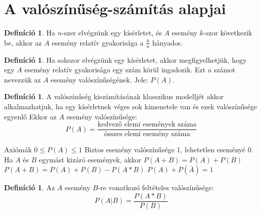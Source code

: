 \documentclass[twoside,12pt]{report}
\theoremstyle{definition}
\newtheorem{definition}[theorem]{Definíció}
\begin{document}
\section{A valószínűség-számítás alapjai}
	\begin{definition}
		Ha $n$-szer elvégzünk egy kísérletet, és $A$ esemény $k$-szor következik be, akkor az $A$ esemény relatív gyakorisága a $\frac{k}{n}$ hányados.
	\end{definition}
	\begin{definition}
		Ha sokszor elvégzünk egy kísérletet, akkor megfigyelhetjük, hogy egy $A$ esemény
		relatív gyakorisága egy szám körül ingadozik. Ezt a számot nevezzük az $A$ esemény valószínűségének. Jele: $P(A)$.
	\end{definition}
	\begin{definition}
		A valószínűség kiszámításának klasszikus modelljét akkor alkalmazhatjuk, ha egy kísérletnek véges sok kimenetele van és ezek valószínűsége egyenlő Ekkor az $A$ esemény valószínűsége:
		\begin{equation*}
			P(A)=\frac{\text{kedvező elemi események száma}}{\text{összes elemi esemény száma}}
		\end{equation*}
	\end{definition}
	\begin{outline}
		\1 Axiómák
			\2 $0\le P(A)\le1$
			\2 Biztos esemény valószínűsége 1, lehetetlen eseményé 0.
			\2 Ha $A$ és $B$ egymást kizáró események, akkor $P(A+B)=P(A)+P(B)$
			\2 $P(A+B)=P(A)+P(B)-P(A*B)$
			\2 $P(A)+P(\overline{A})=1$
	\end{outline}
	\begin{definition}
		Az $A$ esemény $B$-re vonatkozó feltételes valószínűsége: \\
		\begin{equation*}
			P(A|B)=\frac{P(A*B)}{P(B)}
		\end{equation*}
	\end{definition}
	
\end{document}
